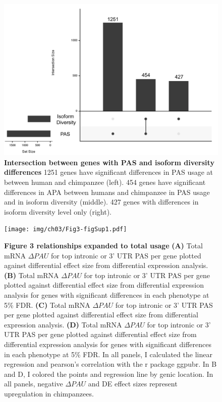 \begin{figure}[!htb]
\centering
\includegraphics[width=5in]{img/ch03/Fig2_figSup7.pdf}
\caption[Intersection between genes with PAS and isoform diversity differences]{\textbf{Intersection between genes with PAS and isoform diversity differences} 1251 genes have significant differences in PAS usage at between human and chimpanzee (left). 454 genes have significant differences in APA between humans and chimpanzee in PAS usage and in isoform diversity (middle). 427 genes with differences in isoform diversity level only (right).}
\label{fig:ch03-simpNum}
\end{figure}
\clearpage

\begin{figure}[!htb]
\centering
\texttt{[image: img/ch03/Fig3-figSup1.pdf]}
\caption[Figure 3 relationships expanded to total usage]{\textbf{Figure 3 relationships expanded to total usage} {\bf (A)}  Total mRNA  $\Delta PAU$ for top intronic or 3' UTR PAS per gene plotted against differential effect size from differential expression analysis. {\bf (B)} Total mRNA $\Delta PAU$ for top intronic or 3' UTR PAS per gene plotted against differential effect size from differential expression analysis for genes with significant differences in each phenotype at 5\% FDR. {\bf (C)} Total mRNA $\Delta PAU$ for top intronic or 3' UTR PAS per gene plotted against differential effect size from differential expression analysis. {\bf (D)} Total mRNA $\Delta PAU$ for top intronic or 3' UTR PAS per gene plotted against differential effect size from differential expression analysis for genes with significant differences in each phenotype at 5\% FDR. In all panels, I calculated the linear regression and pearson's correlation with the r package ggpubr. In B and D, I  colored the points and regression line by genic location. In all panels, negative $\Delta PAU$ and DE effect sizes represent upregulation in chimpanzees.}
\label{fig:ch03-totalDPASDE}
\end{figure}
\clearpage

